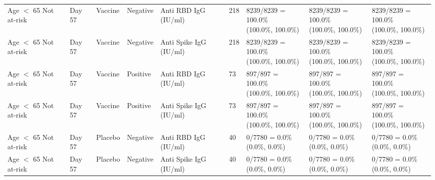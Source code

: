 \documentclass[]{book}
\theoremstyle{definition}
\theoremstyle{definition}
\theoremstyle{definition}
\newcommand{\1}{\mathbbm{1}}
\begin{document}
\begin{landscape}
\begin{ThreePartTable}
\begin{longtable}[t]{>{\raggedright\arraybackslash}p{2.7cm}llllllll}
\hspace{1em}Age $<$ 65 Not at-risk & Day 57 & Vaccine & Negative & Anti RBD IgG (IU/ml) & 218 & \makecell[l]{8239/8239 = 100.0\%\\(100.0\%, 100.0\%)} & \makecell[l]{8239/8239 = 100.0\%\\(100.0\%, 100.0\%)} & \makecell[l]{8239/8239 = 100.0\%\\(100.0\%, 100.0\%)}\\
\hspace{1em}Age $<$ 65 Not at-risk & Day 57 & Vaccine & Negative & Anti Spike IgG (IU/ml) & 218 & \makecell[l]{8239/8239 = 100.0\%\\(100.0\%, 100.0\%)} & \makecell[l]{8239/8239 = 100.0\%\\(100.0\%, 100.0\%)} & \makecell[l]{8239/8239 = 100.0\%\\(100.0\%, 100.0\%)}\\
\hspace{1em}Age $<$ 65 Not at-risk & Day 57 & Vaccine & Positive & Anti RBD IgG (IU/ml) & 73 & \makecell[l]{897/897 = 100.0\%\\(100.0\%, 100.0\%)} & \makecell[l]{897/897 = 100.0\%\\(100.0\%, 100.0\%)} & \makecell[l]{897/897 = 100.0\%\\(100.0\%, 100.0\%)}\\
\hspace{1em}Age $<$ 65 Not at-risk & Day 57 & Vaccine & Positive & Anti Spike IgG (IU/ml) & 73 & \makecell[l]{897/897 = 100.0\%\\(100.0\%, 100.0\%)} & \makecell[l]{897/897 = 100.0\%\\(100.0\%, 100.0\%)} & \makecell[l]{897/897 = 100.0\%\\(100.0\%, 100.0\%)}\\
\hspace{1em}Age $<$ 65 Not at-risk & Day 57 & Placebo & Negative & Anti RBD IgG (IU/ml) & 40 & \makecell[l]{0/7780 = 0.0\%\\(0.0\%, 0.0\%)} & \makecell[l]{0/7780 = 0.0\%\\(0.0\%, 0.0\%)} & \makecell[l]{0/7780 = 0.0\%\\(0.0\%, 0.0\%)}\\
\hspace{1em}Age $<$ 65 Not at-risk & Day 57 & Placebo & Negative & Anti Spike IgG (IU/ml) & 40 & \makecell[l]{0/7780 = 0.0\%\\(0.0\%, 0.0\%)} & \makecell[l]{0/7780 = 0.0\%\\(0.0\%, 0.0\%)} & \makecell[l]{0/7780 = 0.0\%\\(0.0\%, 0.0\%)}\\

\end{longtable}
\end{ThreePartTable}
\end{landscape}
\end{document}

